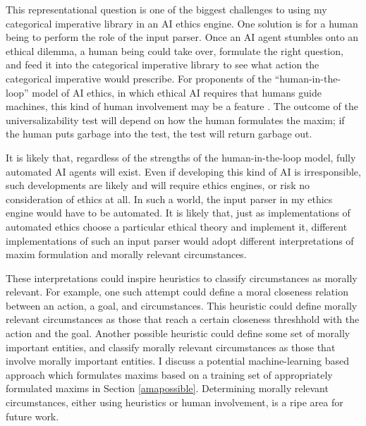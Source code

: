 \begin{isabellebody}
\begin{isamarkuptext}
This representational question is one of the biggest challenges to using my categorical imperative library
in an AI ethics engine. One solution is for a human being to perform the role of the input
parser. Once an AI agent stumbles onto an ethical dilemma, a human being could take over, formulate 
the right question, and feed it into the categorical imperative library to see what action the categorical 
imperative would prescribe. For proponents of the ``human-in-the-loop'' model of AI ethics, in which 
ethical AI requires that humans guide machines, this kind of human involvement may be a feature \citep{loop}.
The outcome of the universalizability test will depend on how the human formulates the maxim; if the 
human puts garbage into the test, the test will return garbage out.

It is likely that, regardless of the strengths of the human-in-the-loop model, fully automated AI 
agents will exist. Even if developing this kind of AI is irresponsible,
such developments are likely and will require ethics engines, or risk no consideration of ethics at all.
In such a world, the input parser in my ethics engine would have to be automated.
It is likely that, just as implementations of automated ethics choose 
a particular ethical theory and implement it, different implementations of such an input parser would 
adopt different interpretations of maxim formulation and morally relevant circumstances. 

These interpretations could inspire heuristics to classify circumstances as morally 
relevant. For example, one such attempt could define a moral closeness relation between an action, a 
goal, and circumstances. This heuristic could define morally relevant circumstances as those that 
reach a certain closeness threshhold with the action and the goal. Another possible heuristic could 
define some set of morally important entities, and classify morally relevant circumstances as those
that involve morally important entities. I discuss a potential machine-learning based approach which formulates
maxims based on a training set of appropriately formulated maxims in Section \ref{amapossible}.
Determining morally relevant circumstances, either using heuristics or human involvement, is a ripe 
area for future work.


\end{isamarkuptext}
\end{isabellebody}
